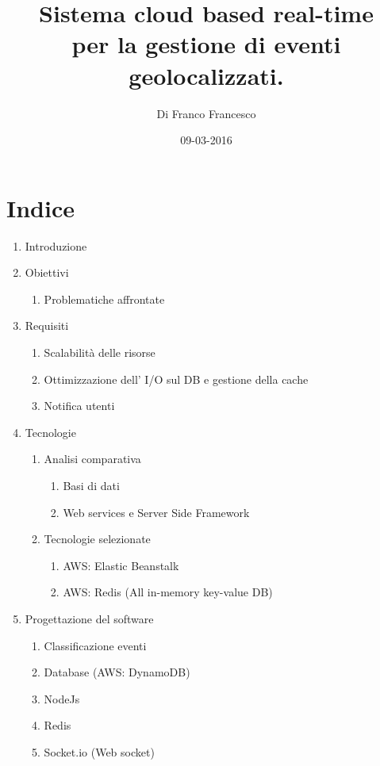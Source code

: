 \documentclass[a4paper, 11pt]{report}
\title{Sistema cloud based real-time \\per la gestione di eventi geolocalizzati.}
\author{Di Franco Francesco}
\date{09-03-2016}
\begin{document}






\chapter*{Indice}


\large
\begin{enumerate}[label*=\arabic*.]
\item Introduzione %

\item Obiettivi %
\begin{enumerate}[label*=\arabic*.]
	\item Problematiche affrontate %
	
\end{enumerate}

\item Requisiti %
\begin{enumerate}[label*=\arabic*.]
	\item Scalabilit\`a delle risorse %
	\item Ottimizzazione dell' I/O sul DB e gestione della cache %
	\item Notifica utenti %
\end{enumerate}

\item Tecnologie %
\begin{enumerate}[label*=\arabic*.]
	\item Analisi comparativa %
	\begin{enumerate}[label*=\arabic*.]
		\item Basi di dati %
		\item Web services e Server Side Framework %
	\end{enumerate}

	\item Tecnologie selezionate %
	\begin{enumerate}[label*=\arabic*.]
		\item AWS: Elastic Beanstalk %
		\item AWS: Redis  (All in-memory key-value DB)%
	\end{enumerate}
\end{enumerate}

\item Progettazione del software %
\begin{enumerate}[label*=\arabic*.]
	\item Classificazione eventi %
	\item Database (AWS: DynamoDB)
	\item NodeJs 
	\item Redis
	\item Socket.io (Web socket)
\end{enumerate}


\end{enumerate}
\end{document}
